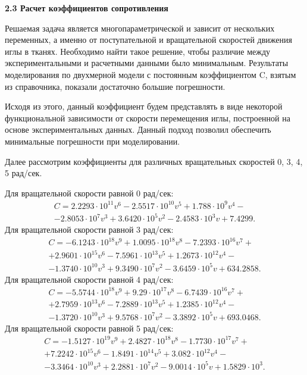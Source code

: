 \documentclass[10pt]{article}
\begin{document}
\bigskip
\textbf{2.3 Расчет коэффициентов сопротивления}

Решаемая задача является многопараметрической и зависит от нескольких переменных, а именно от поступательной и вращательной скоростей движения иглы в тканях. Необходимо найти такое решение, чтобы различие между экспериментальными и расчетными данными было минимальным. 
Результаты моделирования по двухмерной модели с постоянным коэффициентом C, взятым из справочника, показали достаточно большие погрешности. 

Исходя из этого, данный коэффициент будем представлять в виде некоторой функциональной зависимости от скорости перемещения иглы, построенной на основе экспериментальных данных.  Данный подход позволил  обеспечить минимальные погрешности при моделировании.

Далее рассмотрим коэффициенты для различных вращательных скоростей 0, 3, 4, 5 рад/сек.  

Для вращательной скорости равной 0 рад/сек:
\begin{multline} \label{eq12}
C= 2.2293\cdot10^{11} v^6 - 2.5517\cdot10^{10} v^5+1.788\cdot10^9 v^4 - \\ -2.8053\cdot10^7 v^3 +3.6420\cdot10^5 v^2-2.4583\cdot10^3 v+7.4299.
\end{multline}
Для вращательной скорости равной 3 рад/сек:
\begin{multline} \label{eq13}
C= -6.1243\cdot10^{18} v^9 + 1.0095\cdot10^{18}v^8 -  7.2393\cdot10^{16} v^7 +\\+ 2.9601\cdot10^{15} v^6 - 7.5961\cdot10^{13} v^5 + 1.2673\cdot10^{12} v^4 - \\-1.3740\cdot10^{10} v^3 + 9.3490\cdot10^7 v^2 - 3.6459\cdot10^5 v+ 634.2858.
\end{multline}
Для вращательной скорости равной 4 рад/сек:
\begin{multline} \label{eq14}
C= -5.5744\cdot10^{18} v^9 + 9.29\cdot10^{17}v^8 -  6.7439\cdot10^{16} v^7 +\\+ 2.7959\cdot10^{13} v^6 - 7.2889\cdot10^{13} v^5 + 1.2385\cdot10^{12} v^4 - \\-1.3720\cdot10^{10} v^3 + 9.5768\cdot10^7 v^2 - 3.3892\cdot10^5 v+ 693.0468.
\end{multline}
Для вращательной скорости равной 5 рад/сек:
\begin{multline} \label{eq15}
C= -1.5127\cdot10^{19} v^9 + 2.4827\cdot10^{18}v^8 -  1.7730\cdot10^{17} v^7 +\\+ 7.2242\cdot10^{15} v^6 - 1.8491\cdot10^{14} v^5 + 3.082\cdot10^{12} v^4 - \\-3.3464\cdot10^{10} v^3 + 2.2881\cdot10^7 v^2 - 9.0014\cdot10^5 v+ 1.5829\cdot10^3.
\end{multline}
\end{document}
